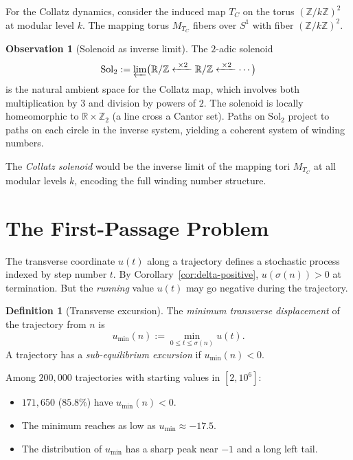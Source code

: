 \documentclass[11pt,a4paper]{article}
\newcommand{\Z}{\mathbb{Z}}
\newcommand{\R}{\mathbb{R}}
\newcommand{\Sol}{\mathrm{Sol}}
\theoremstyle{plain}
\theoremstyle{definition}
\newtheorem{definition}[theorem]{Definition}
\newtheorem{observation}[theorem]{Observation}
\begin{document}
For the Collatz dynamics, consider the induced map $T_C$ on the torus $(\Z/k\Z)^2$ at modular level $k$. The mapping torus $M_{T_C}$ fibers over $S^1$ with fiber $(\Z/k\Z)^2$.

\begin{observation}[Solenoid as inverse limit]\label{obs:solenoid}
    The $2$-adic solenoid
    \begin{equation}
        \Sol_2 := \varprojlim\bigl(\R/\Z \xleftarrow{\;\times 2\;} \R/\Z \xleftarrow{\;\times 2\;} \cdots\bigr)
    \end{equation}
    is the natural ambient space for the Collatz map, which involves both multiplication by $3$ and division by powers of $2$. The solenoid is locally homeomorphic to $\R \times \Z_2$ (a line cross a Cantor set). Paths on $\Sol_2$ project to paths on each circle in the inverse system, yielding a coherent system of winding numbers.

    The \emph{Collatz solenoid} would be the inverse limit of the mapping tori $M_{T_C}$ at all modular levels $k$, encoding the full winding number structure.
\end{observation}


\section{The First-Passage Problem}\label{sec:first-passage}

The transverse coordinate $u(t)$ along a trajectory defines a stochastic process indexed by step number $t$. By Corollary~\ref{cor:delta-positive}, $u(\sigma(n)) > 0$ at termination. But the \emph{running} value $u(t)$ may go negative during the trajectory.

\begin{definition}[Transverse excursion]
    The \emph{minimum transverse displacement} of the trajectory from $n$ is
    \begin{equation}
        u_{\min}(n) := \min_{0 \leq t \leq \sigma(n)} u(t).
    \end{equation}
    A trajectory has a \emph{sub-equilibrium excursion} if $u_{\min}(n) < 0$.
\end{definition}

\begin{empirical}
    Among $200{,}000$ trajectories with starting values in $[2, 10^6]$:
    \begin{itemize}
        \item $171{,}650$ ($85.8\%$) have $u_{\min}(n) < 0$.
        \item The minimum reaches as low as $u_{\min} \approx -17.5$.
        \item The distribution of $u_{\min}$ has a sharp peak near $-1$ and a long left tail.
    \end{itemize}
\end{empirical}
\end{document}
